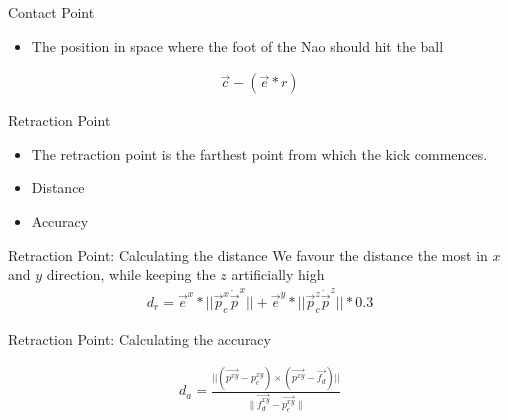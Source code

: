 \documentclass{beamer}
\begin{document}
\begin{frame}{Contact Point}
    \begin{itemize}
        \item The position in space where the foot of the Nao should hit the ball
    \end{itemize}

    \begin{align*}
        \vec{c} - ( \vec{e} * r )
    \end{align*}
\end{frame}


\begin{frame}{Retraction Point} 
    \begin{itemize}
        \item      The retraction point is the farthest point from which the kick commences.
        \item      Distance
        \item      Accuracy
    \end{itemize}
\end{frame}


\begin{frame}{Retraction Point: Calculating the distance} 
    We favour the distance the most in $x$ and $y$ direction, while keeping the
    $z$ artificially high
        \begin{align}
        d_r = \vec{e}^{x} * || \vec{p}_{c}^{x} \dot \vec{p}^{x} || + \vec{e}^y * ||\vec{p}_{c}^z
            \dot \vec{p}^z|| * 0.3
        \end{align}
\end{frame}

\begin{frame}{Retraction Point: Calculating the accuracy}
    
\begin{figure}
  \resizebox{\textwidth}{!} {
    }
    \label{fig:accuracy}
\end{figure}    
    \begin{align*}
        d_a = \frac{||(\vec{p^{xy}} - p_c^{xy}) \times (\vec{p^{xy}} -
        \vec{f_d})||}{\|\vec{f_d^{xy}}- \vec{p_c^{xy}}\|}
    \end{align*}
\end{frame}
\end{document}
